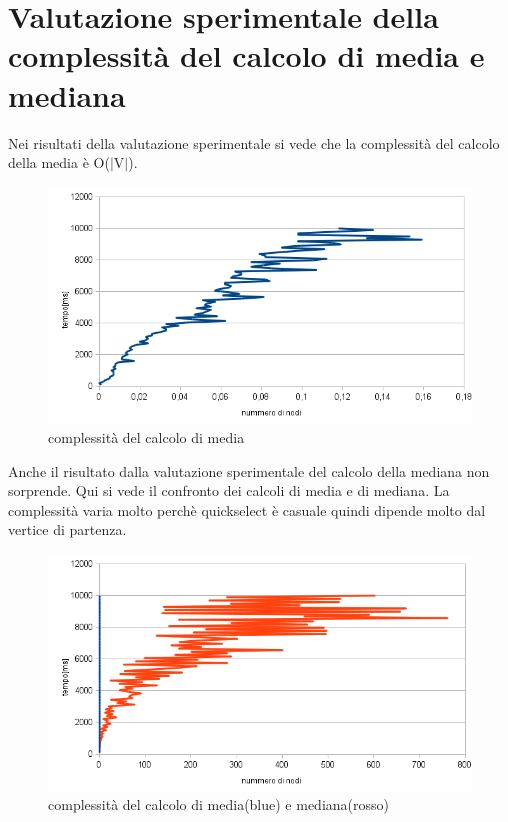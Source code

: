\documentclass[11pt, a4paper, titlepage, block]{article}
\begin{document}
\section{Valutazione sperimentale della complessit\`{a} del calcolo di media e mediana}
Nei risultati della valutazione sperimentale si vede che la complessit\`{a} del calcolo della media \`{e} O($|$V$|$).
\begin{figure}[htp]
\centering
\includegraphics[scale=0.80]{img/calcolo_media.png}
\caption{complessit\`{a} del calcolo di media}
\end{figure}
\newpage
Anche il risultato dalla valutazione sperimentale del calcolo della mediana non sorprende. Qui si vede il confronto dei calcoli di media e di mediana. 
La complessit\`{a} varia molto perch\`{e} quickselect \`{e} casuale quindi dipende molto dal vertice di partenza.
\begin{figure}[htp]
\centering
\includegraphics[scale=0.80]{img/calcolo_mediana.png}
\caption{complessit\`{a} del calcolo di media(blue) e mediana(rosso)}
\end{figure}
\end{document}
